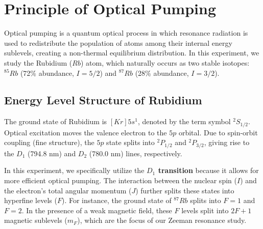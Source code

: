 \section{Principle of Optical Pumping}

Optical pumping is a quantum optical process in which resonance radiation is used to redistribute the population of atoms among their internal energy sublevels, creating a non-thermal equilibrium distribution. In this experiment, we study the Rubidium ($Rb$) atom, which naturally occurs as two stable isotopes: $^{85}Rb$ (72\% abundance, $I=5/2$) and $^{87}Rb$ (28\% abundance, $I=3/2$).

\subsection{Energy Level Structure of Rubidium}
The ground state of Rubidium is $[Kr]5s^1$, denoted by the term symbol $^{2}S_{1/2}$. Optical excitation moves the valence electron to the $5p$ orbital. Due to spin-orbit coupling (fine structure), the $5p$ state splits into $^{2}P_{1/2}$ and $^{2}P_{3/2}$, giving rise to the $D_1$ (794.8 nm) and $D_2$ (780.0 nm) lines, respectively.

In this experiment, we specifically utilize the \textbf{$D_1$ transition} because it allows for more efficient optical pumping. The interaction between the nuclear spin ($I$) and the electron's total angular momentum ($J$) further splits these states into hyperfine levels ($F$). For instance, the ground state of $^{87}Rb$ splits into $F=1$ and $F=2$. In the presence of a weak magnetic field, these $F$ levels split into $2F+1$ magnetic sublevels ($m_F$), which are the focus of our Zeeman resonance study.


